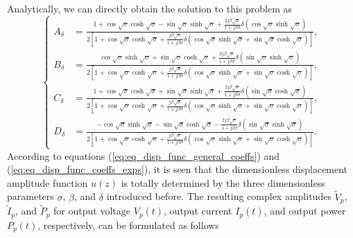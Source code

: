 \documentclass{article}
\begin{document}
Analytically, we can directly obtain the solution to this problem as 
\begin{equation}
    \left\{\begin{aligned}
        A_\delta &= \frac{ 1 + \cos\sqrt{\sigma } \cosh\sqrt{\sigma } - \sin\sqrt{\sigma } \sinh\sqrt{\sigma} + \frac{2 j \beta \sqrt{\sigma}}{ 1+ j \beta \sigma } \delta \left( \cos\sqrt{\sigma } \sinh\sqrt{\sigma } \right)}{2 \left[ 1 + \cos\sqrt{\sigma } \cosh\sqrt{\sigma } + \frac{j \beta \sqrt{\sigma}}{ 1+ j \beta \sigma } \delta \left( \cos\sqrt{\sigma } \sinh\sqrt{\sigma } + \sin\sqrt{\sigma } \cosh\sqrt{\sigma } \right) \right]}, \\
        B_\delta &= \frac{ \cos\sqrt{\sigma } \sinh\sqrt{\sigma } + \sin\sqrt{\sigma } \cosh\sqrt{\sigma} + \frac{2 j \beta \sqrt{\sigma}}{ 1+ j \beta \sigma } \delta \left( \sin\sqrt{\sigma } \sinh\sqrt{\sigma } \right)}{2 \left[ 1 + \cos\sqrt{\sigma } \cosh\sqrt{\sigma } + \frac{j \beta \sqrt{\sigma}}{ 1+ j \beta \sigma } \delta \left( \cos\sqrt{\sigma } \sinh\sqrt{\sigma } + \sin\sqrt{\sigma } \cosh\sqrt{\sigma } \right) \right]}, \\
        C_\delta &= \frac{ 1 + \cos\sqrt{\sigma } \cosh\sqrt{\sigma } + \sin\sqrt{\sigma } \sinh\sqrt{\sigma} + \frac{2 j \beta \sqrt{\sigma}}{ 1+ j \beta \sigma } \delta \left( \sin\sqrt{\sigma } \cosh\sqrt{\sigma } \right)}{2 \left[ 1 + \cos\sqrt{\sigma } \cosh\sqrt{\sigma } + \frac{j \beta \sqrt{\sigma}}{ 1+ j \beta \sigma } \delta \left( \cos\sqrt{\sigma } \sinh\sqrt{\sigma } + \sin\sqrt{\sigma } \cosh\sqrt{\sigma } \right) \right]}, \\
        D_\delta &= \frac{ -\cos\sqrt{\sigma } \sinh\sqrt{\sigma } - \sin\sqrt{\sigma } \cosh\sqrt{\sigma} -  \frac{2 j \beta \sqrt{\sigma}}{ 1+ j \beta \sigma } \delta \left( \sin\sqrt{\sigma } \sinh\sqrt{\sigma } \right)}{2 \left[ 1 + \cos\sqrt{\sigma } \cosh\sqrt{\sigma } + \frac{j \beta \sqrt{\sigma}}{ 1+ j \beta \sigma } \delta \left( \cos\sqrt{\sigma } \sinh\sqrt{\sigma } + \sin\sqrt{\sigma } \cosh\sqrt{\sigma } \right) \right]}.
    \end{aligned}\right.
    \label{eq:eq_disp_func_coeffs_exps}
\end{equation}
According to equations (\ref{eq:eq_disp_func_general_coeffs}) and (\ref{eq:eq_disp_func_coeffs_exps}), it is seen that the dimensionless displacement amplitude function $u(z)$ is totally determined by the three dimensionless parameters $\sigma$, $\beta$, and $\delta$ introduced before. The resulting complex amplitudes $\tilde{V}_p$, $\tilde{I}_p$, and $\tilde{P}_p$ for output voltage $V_p(t)$, output current $I_p(t)$, and output power $P_p(t)$, respectively, can be formulated as follows
\end{document}
